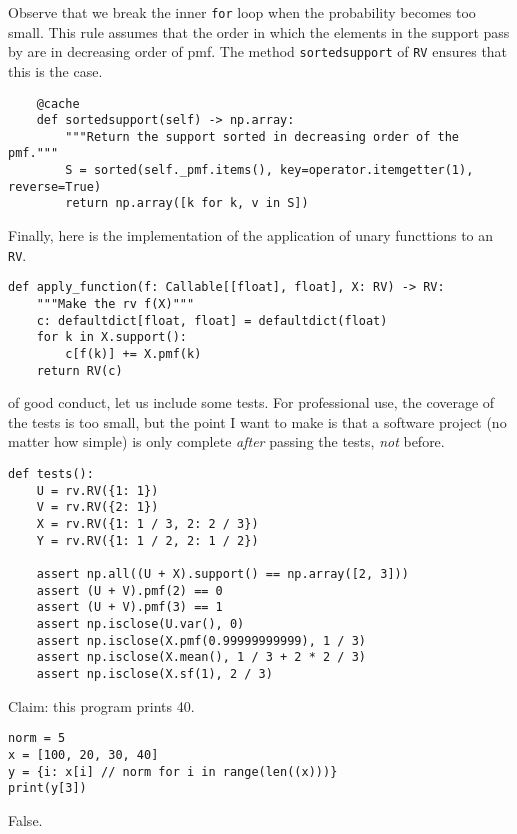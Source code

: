 \documentclass[stochastic-or]{subfiles}
\begin{document}
Observe that we break the inner \texttt{for} loop when the probability becomes too small.
This rule assumes that the order in which the elements in the support pass by are in decreasing order of pmf.
The method \texttt{sortedsupport} of \texttt{RV} ensures that this is the case.

\begin{verbatim}
    @cache
    def sortedsupport(self) -> np.array:
        """Return the support sorted in decreasing order of the pmf."""
        S = sorted(self._pmf.items(), key=operator.itemgetter(1), reverse=True)
        return np.array([k for k, v in S])
\end{verbatim}

Finally, here is the implementation of the application of unary functtions to an \texttt{RV}.
\begin{verbatim}
def apply_function(f: Callable[[float], float], X: RV) -> RV:
    """Make the rv f(X)"""
    c: defaultdict[float, float] = defaultdict(float)
    for k in X.support():
        c[f(k)] += X.pmf(k)
    return RV(c)
\end{verbatim}

 of good conduct, let us include some tests.
For professional use, the coverage of the tests is too small, but the point I want to make is that a software project (no matter how simple) is only complete \emph{after}  passing the tests, \emph{not} before.
\begin{verbatim}
def tests():
    U = rv.RV({1: 1})
    V = rv.RV({2: 1})
    X = rv.RV({1: 1 / 3, 2: 2 / 3})
    Y = rv.RV({1: 1 / 2, 2: 1 / 2})

    assert np.all((U + X).support() == np.array([2, 3]))
    assert (U + V).pmf(2) == 0
    assert (U + V).pmf(3) == 1
    assert np.isclose(U.var(), 0)
    assert np.isclose(X.pmf(0.99999999999), 1 / 3)
    assert np.isclose(X.mean(), 1 / 3 + 2 * 2 / 3)
    assert np.isclose(X.sf(1), 2 / 3)
\end{verbatim}


\begin{truefalse}
Claim: this program prints 40.
\begin{verbatim}
norm = 5
x = [100, 20, 30, 40]
y = {i: x[i] // norm for i in range(len((x)))}
print(y[3])
\end{verbatim}
\begin{solution}
False.
\end{solution}
\end{truefalse}
\end{document}
